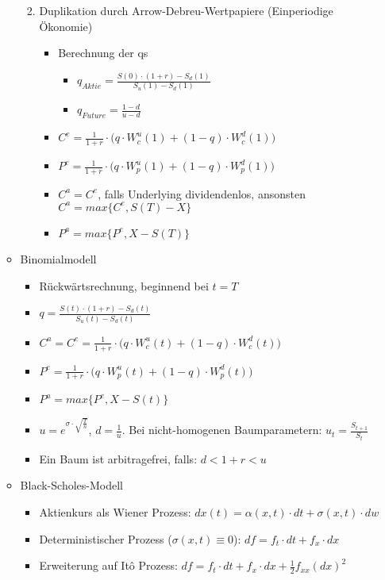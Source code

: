 \begin{itemize}
\begin{itemize}
\begin{enumerate}
\begin{itemize}
			\end{itemize}
			\item Duplikation durch Arrow-Debreu-Wertpapiere (Einperiodige Ökonomie)
			\begin{itemize}
				\item Berechnung der qs
				\begin{itemize}
					\item \(q_{Aktie}=\frac{S(0)\cdot(1+r)-S_d(1)}{S_u(1)-S_d(1)}\)
					\item \(q_{Future}=\frac{1-d}{u-d}\)
				\end{itemize}
				\item \(C^e=\frac{1}{1+r}\cdot\Big(q\cdot W_c^u(1)+(1-q)\cdot W_c^d(1)\Big)\)
				\item \(P^e=\frac{1}{1+r}\cdot\Big(q\cdot W_p^u(1)+(1-q)\cdot W_p^d(1)\Big)\)
				\item \(C^a=C^e\), falls Underlying dividendenlos, ansonsten \(C^a=max\Big\{C^e,S(T)-X\Big\}\)
				\item \(P^a=max\Big\{P^e,X-S(T)\Big\}\)
			\end{itemize}
		\end{enumerate}
		\item Binomialmodell
		\begin{itemize}
			\item Rückwärtsrechnung, beginnend bei \(t=T\)
			\item \(q=\frac{S(t)\cdot(1+r)-S_d(t)}{S_u(t)-S_d(t)}\)
			\item \(C^a=C^e=\frac{1}{1+r}\cdot\Big(q\cdot W_c^u(t)+(1-q)\cdot W_c^d(t)\Big)\)
			\item \(P^e=\frac{1}{1+r}\cdot\Big(q\cdot W_p^u(t)+(1-q)\cdot W_p^d(t)\Big)\)
			\item \(P^a=max\Big\{P^e,X-S(t)\Big\}\)
			\item \(u=e^{\sigma\cdot\sqrt{\frac{T}{n}}}\), \(d=\frac{1}{u}\). Bei nicht-homogenen Baumparametern: \(u_t=\frac{S_{t+1}}{S_t}\)
			\item Ein Baum ist arbitragefrei, falls: \(d<1+r<u\)
		\end{itemize}
		\item Black-Scholes-Modell
		\begin{itemize}
			\item Aktienkurs als Wiener Prozess: \(dx(t) = \alpha(x,t)\cdot dt + \sigma(x,t)\cdot dw\)
			\item Deterministischer Prozess (\(\sigma(x,t) \equiv 0\)): \(df=f_t\cdot dt + f_x\cdot dx\)
			\item Erweiterung auf Itô Prozess: \(df=f_t\cdot dt + f_x\cdot dx + \frac{1}{2} f_{xx}(dx)^2\)

\end{itemize}
\end{itemize}
\end{itemize}
